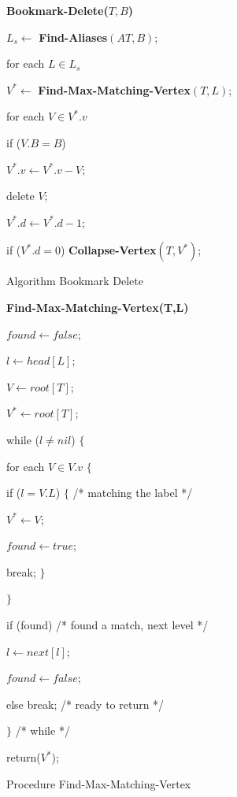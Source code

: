 \begin{figure}
{\bf Bookmark-Delete($T,B$)}
\begin{nlist}
\item $L_s \leftarrow$ {\bf Find-Aliases}$(AT, B)$;
\item for each $L \in L_s$
 \begin{nlist}
 \item $V^* \leftarrow$ {\bf Find-Max-Matching-Vertex}$(T,L)$;
 \item for each $V \in V^*.v$
  \begin{nlist}
  \item if ($V.B = B$) 
   \begin{nlist}
   \item $V^*.v \leftarrow V^*.v - V$;
   \item delete $V$;
   \end{nlist}
  \item $V^*.d \leftarrow V^*.d - 1$;
  \item if ($V^*.d = 0$) {\bf Collapse-Vertex}$(T, V^*)$;
  \end{nlist}
 \end{nlist}
\end{nlist}
\caption{Algorithm Bookmark Delete}
\label{fig-delete}
\end{figure}

\begin{figure}
{\bf Find-Max-Matching-Vertex(T,L)}
\begin{nlist}
\item $found \leftarrow false$;
\item $l \leftarrow head[L]$;
\item $V \leftarrow root[T]$;
\item $V^* \leftarrow root[T]$;
\item while ($l \ne nil$) $\{$
 \begin{nlist}
 \item for each $V \in V.v$ $\{$
  \begin{nlist}
  \item if ($l = V.L$) $\{$ /* matching the label */
   \begin{nlist}
   \item $V^* \leftarrow V$; \item $found \leftarrow true$;
   \item break; $\}$
   \end{nlist}
  \item $\}$
  \end{nlist}
 \item if (found) /* found a match, next level */
  \begin{nlist}
  \item $l \leftarrow next[l]$; 
  \item $found \leftarrow false$;
  \end{nlist}
 \item else break; /* ready to return */
 \end{nlist}
\item $\}$ /* while */
\item return($V^*$);
\end{nlist}
\caption{Procedure Find-Max-Matching-Vertex}
\label{fig-max}
\end{figure}


